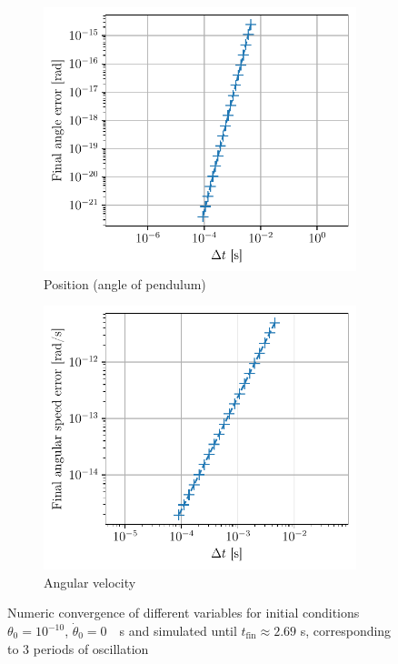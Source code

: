 \begin{figure}[h]
    \centering
    \begin{subfigure}{0.48\linewidth}
        \centering
        \includegraphics[width=\linewidth]{figures/no_excitation_pos_conv.pdf}
        \caption{Position (angle of pendulum)}
    \end{subfigure}
    \begin{subfigure}{0.48\linewidth}
        \centering
        \includegraphics[width=\linewidth]{figures/no_excitation_vel_conv.pdf}
        \caption{Angular velocity}
    \end{subfigure}
    \caption{Numeric convergence of different variables for initial conditions \(\theta_0=10^{-10}\), \mbox{\(\dot\theta_0=0\) \si{\per\second}} and simulated until \(t_\textrm{fin} \approx 2.69\) \si{\second}, corresponding to 3 periods of oscillation}
    \label{fig:numeric_convergence_small_angle}
\end{figure}

